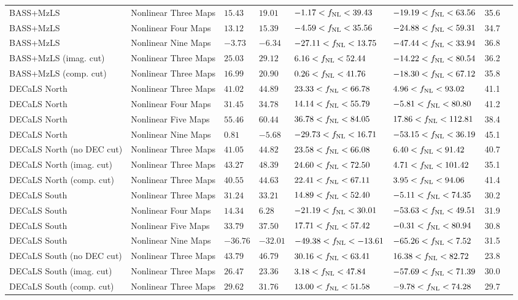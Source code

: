 \begin{table}
{\begin{tabular}{llllllll}
\hline
BASS+MzLS                 & Nonlinear Three Maps& $ 15.43$& $ 19.01$& $ -1.17<f_{\rm NL}< 39.43$& $-19.19<f_{\rm NL}< 63.56$ &   35.6\\
BASS+MzLS                 & Nonlinear Four Maps& $ 13.12$& $ 15.39$& $ -4.59<f_{\rm NL}< 35.56$& $-24.88<f_{\rm NL}< 59.31$ &   34.7\\
BASS+MzLS                 & Nonlinear Nine Maps& $ -3.73$& $ -6.34$& $-27.11<f_{\rm NL}< 13.75$& $-47.44<f_{\rm NL}< 33.94$ &   36.8\\
BASS+MzLS (imag. cut)     & Nonlinear Three Maps& $ 25.03$& $ 29.12$& $  6.16<f_{\rm NL}< 52.44$& $-14.22<f_{\rm NL}< 80.54$ &   36.2\\
BASS+MzLS (comp. cut)     & Nonlinear Three Maps& $ 16.99$& $ 20.90$& $  0.26<f_{\rm NL}< 41.76$& $-18.30<f_{\rm NL}< 67.12$ &   35.8\\
DECaLS North              & Nonlinear Three Maps& $ 41.02$& $ 44.89$& $ 23.33<f_{\rm NL}< 66.78$& $  4.96<f_{\rm NL}< 93.02$ &   41.1\\
DECaLS North              & Nonlinear Four Maps& $ 31.45$& $ 34.78$& $ 14.14<f_{\rm NL}< 55.79$& $ -5.81<f_{\rm NL}< 80.80$ &   41.2\\
DECaLS North              & Nonlinear Five Maps& $ 55.46$& $ 60.44$& $ 36.78<f_{\rm NL}< 84.05$& $ 17.86<f_{\rm NL}<112.81$ &   38.4\\
DECaLS North              & Nonlinear Nine Maps& $  0.81$& $ -5.68$& $-29.73<f_{\rm NL}< 16.71$& $-53.15<f_{\rm NL}< 36.19$ &   45.1\\
DECaLS North (no DEC cut) & Nonlinear Three Maps& $ 41.05$& $ 44.82$& $ 23.58<f_{\rm NL}< 66.08$& $  6.40<f_{\rm NL}< 91.42$ &   40.7\\
DECaLS North (imag. cut)  & Nonlinear Three Maps& $ 43.27$& $ 48.39$& $ 24.60<f_{\rm NL}< 72.50$& $  4.71<f_{\rm NL}<101.42$ &   35.1\\
DECaLS North (comp. cut)  & Nonlinear Three Maps& $ 40.55$& $ 44.63$& $ 22.41<f_{\rm NL}< 67.11$& $  3.95<f_{\rm NL}< 94.06$ &   41.4\\
DECaLS South              & Nonlinear Three Maps& $ 31.24$& $ 33.21$& $ 14.89<f_{\rm NL}< 52.40$& $ -5.11<f_{\rm NL}< 74.35$ &   30.2\\
DECaLS South              & Nonlinear Four Maps& $ 14.34$& $  6.28$& $-21.19<f_{\rm NL}< 30.01$& $-53.63<f_{\rm NL}< 49.51$ &   31.9\\
DECaLS South              & Nonlinear Five Maps& $ 33.79$& $ 37.50$& $ 17.71<f_{\rm NL}< 57.42$& $ -0.31<f_{\rm NL}< 80.94$ &   30.8\\
DECaLS South              & Nonlinear Nine Maps& $-36.76$& $-32.01$& $-49.38<f_{\rm NL}<-13.61$& $-65.26<f_{\rm NL}<  7.52$ &   31.5\\
DECaLS South (no DEC cut) & Nonlinear Three Maps& $ 43.79$& $ 46.79$& $ 30.16<f_{\rm NL}< 63.41$& $ 16.38<f_{\rm NL}< 82.72$ &   23.8\\
DECaLS South (imag. cut)  & Nonlinear Three Maps& $ 26.47$& $ 23.36$& $  3.18<f_{\rm NL}< 47.84$& $-57.69<f_{\rm NL}< 71.39$ &   30.0\\
DECaLS South (comp. cut)  & Nonlinear Three Maps& $ 29.62$& $ 31.76$& $ 13.00<f_{\rm NL}< 51.58$& $ -9.78<f_{\rm NL}< 74.28$ &   29.7\\
   \hline
    \end{tabular}}
\end{table}
